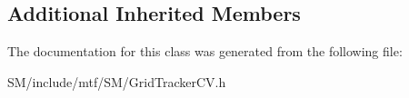 \subsection*{Additional Inherited Members}


The documentation for this class was generated from the following file\-:\begin{DoxyCompactItemize}
\item 
S\-M/include/mtf/\-S\-M/Grid\-Tracker\-C\-V.\-h\end{DoxyCompactItemize}

